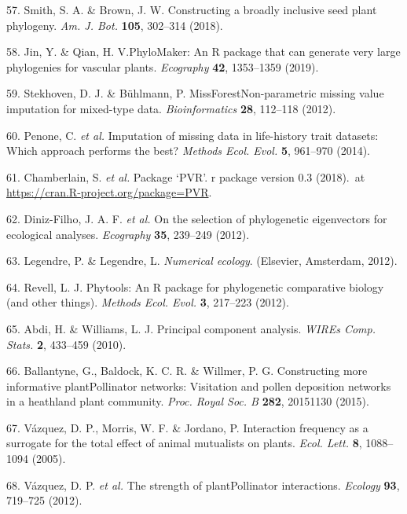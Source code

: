 \documentclass[12pt,a4paper,]{article}
\begin{document}
\hypertarget{ref-smith2018}{}
57. Smith, S. A. \& Brown, J. W. Constructing a broadly inclusive seed
plant phylogeny. \emph{Am. J. Bot.} \textbf{105}, 302--314 (2018).

\hypertarget{ref-jin2019}{}
58. Jin, Y. \& Qian, H. V.PhyloMaker: An R package that can generate
very large phylogenies for vascular plants. \emph{Ecography}
\textbf{42}, 1353--1359 (2019).

\hypertarget{ref-stekhoven2012}{}
59. Stekhoven, D. J. \& Bühlmann, P. MissForestNon-parametric missing
value imputation for mixed-type data. \emph{Bioinformatics} \textbf{28},
112--118 (2012).

\hypertarget{ref-penone2014}{}
60. Penone, C. \emph{et al.} Imputation of missing data in life-history
trait datasets: Which approach performs the best? \emph{Methods Ecol.
Evol.} \textbf{5}, 961--970 (2014).

\hypertarget{ref-santos2018}{}
61. Chamberlain, S. \emph{et al.} Package `PVR'. r package version 0.3
(2018).~at
\href{https://CRAN.R-project.org/package=PVR}{https://cran.R-project.org/package=PVR}.

\hypertarget{ref-diniz-filho2012}{}
62. Diniz-Filho, J. A. F. \emph{et al.} On the selection of phylogenetic
eigenvectors for ecological analyses. \emph{Ecography} \textbf{35},
239--249 (2012).

\hypertarget{ref-legendre2012}{}
63. Legendre, P. \& Legendre, L. \emph{Numerical ecology}. (Elsevier,
Amsterdam, 2012).

\hypertarget{ref-revell2012}{}
64. Revell, L. J. Phytools: An R package for phylogenetic comparative
biology (and other things). \emph{Methods Ecol. Evol.} \textbf{3},
217--223 (2012).

\hypertarget{ref-abdi2010}{}
65. Abdi, H. \& Williams, L. J. Principal component analysis.
\emph{WIREs Comp. Stats.} \textbf{2}, 433--459 (2010).

\hypertarget{ref-ballantyne2015}{}
66. Ballantyne, G., Baldock, K. C. R. \& Willmer, P. G. Constructing
more informative plantPollinator networks: Visitation and pollen
deposition networks in a heathland plant community. \emph{Proc. Royal
Soc. B} \textbf{282}, 20151130 (2015).

\hypertarget{ref-vazquez2005}{}
67. Vázquez, D. P., Morris, W. F. \& Jordano, P. Interaction frequency
as a surrogate for the total effect of animal mutualists on plants.
\emph{Ecol. Lett.} \textbf{8}, 1088--1094 (2005).

\hypertarget{ref-vazquez2012}{}
68. Vázquez, D. P. \emph{et al.} The strength of plantPollinator
interactions. \emph{Ecology} \textbf{93}, 719--725 (2012).
\end{document}

